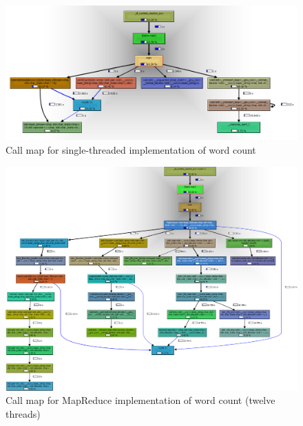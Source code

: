 \documentclass[12pt, letterpaper]{article}
\begin{document}
\newpage
	\begin{figure}[h]
	\centering
	\includegraphics[width=1.35\textwidth, angle=90]{call-graph-part3-cropped}
	\caption{Call map for single-threaded implementation of word count\label{fig:callMapSingleImpl}}
	\end{figure}
\newpage
	\begin{figure}[h]
	\centering
	\includegraphics[width=1.35\textwidth, angle=90]{call-graph-part4-cropped}
	\caption{Call map for MapReduce implementation of word count (twelve threads)\label{fig:callMapMRImpl}}
	\end{figure}
\end{document}
